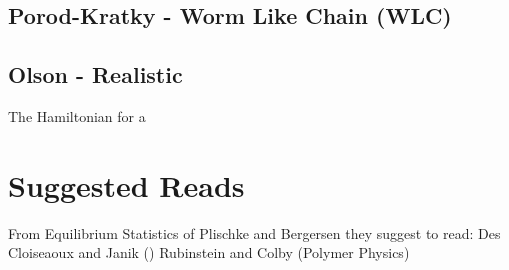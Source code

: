 \subsection{Porod-Kratky - Worm Like Chain (WLC)}

\subsection{Olson - Realistic}

The Hamiltonian for a \cite{czapla2009}





\section{Suggested Reads}

From Equilibrium Statistics of Plischke and Bergersen they suggest to
read:
Des Cloiseaoux and Janik ()
Rubinstein and Colby (Polymer Physics)

